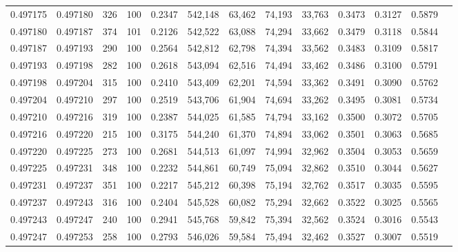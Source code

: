 \begin{tabular}{rrrrrrrrrrrrr}
0.497175 & 0.497180 &   326 & 100 &                                     0.2347 & 542,148 &  63,462 &  74,193 &  33,763 & 0.3473 & 0.3127 & 0.5879 \\
0.497180 & 0.497187 &   374 & 101 &                                     0.2126 & 542,522 &  63,088 &  74,294 &  33,662 & 0.3479 & 0.3118 & 0.5844 \\
0.497187 & 0.497193 &   290 & 100 &                                     0.2564 & 542,812 &  62,798 &  74,394 &  33,562 & 0.3483 & 0.3109 & 0.5817 \\
0.497193 & 0.497198 &   282 & 100 &                                     0.2618 & 543,094 &  62,516 &  74,494 &  33,462 & 0.3486 & 0.3100 & 0.5791 \\
0.497198 & 0.497204 &   315 & 100 &                                     0.2410 & 543,409 &  62,201 &  74,594 &  33,362 & 0.3491 & 0.3090 & 0.5762 \\
0.497204 & 0.497210 &   297 & 100 &                                     0.2519 & 543,706 &  61,904 &  74,694 &  33,262 & 0.3495 & 0.3081 & 0.5734 \\
0.497210 & 0.497216 &   319 & 100 &                                     0.2387 & 544,025 &  61,585 &  74,794 &  33,162 & 0.3500 & 0.3072 & 0.5705 \\
0.497216 & 0.497220 &   215 & 100 &                                     0.3175 & 544,240 &  61,370 &  74,894 &  33,062 & 0.3501 & 0.3063 & 0.5685 \\
0.497220 & 0.497225 &   273 & 100 &                                     0.2681 & 544,513 &  61,097 &  74,994 &  32,962 & 0.3504 & 0.3053 & 0.5659 \\
0.497225 & 0.497231 &   348 & 100 &                                     0.2232 & 544,861 &  60,749 &  75,094 &  32,862 & 0.3510 & 0.3044 & 0.5627 \\
0.497231 & 0.497237 &   351 & 100 &                                     0.2217 & 545,212 &  60,398 &  75,194 &  32,762 & 0.3517 & 0.3035 & 0.5595 \\
0.497237 & 0.497243 &   316 & 100 &                                     0.2404 & 545,528 &  60,082 &  75,294 &  32,662 & 0.3522 & 0.3025 & 0.5565 \\
0.497243 & 0.497247 &   240 & 100 &                                     0.2941 & 545,768 &  59,842 &  75,394 &  32,562 & 0.3524 & 0.3016 & 0.5543 \\
0.497247 & 0.497253 &   258 & 100 &                                     0.2793 & 546,026 &  59,584 &  75,494 &  32,462 & 0.3527 & 0.3007 & 0.5519 \\

\end{tabular}
